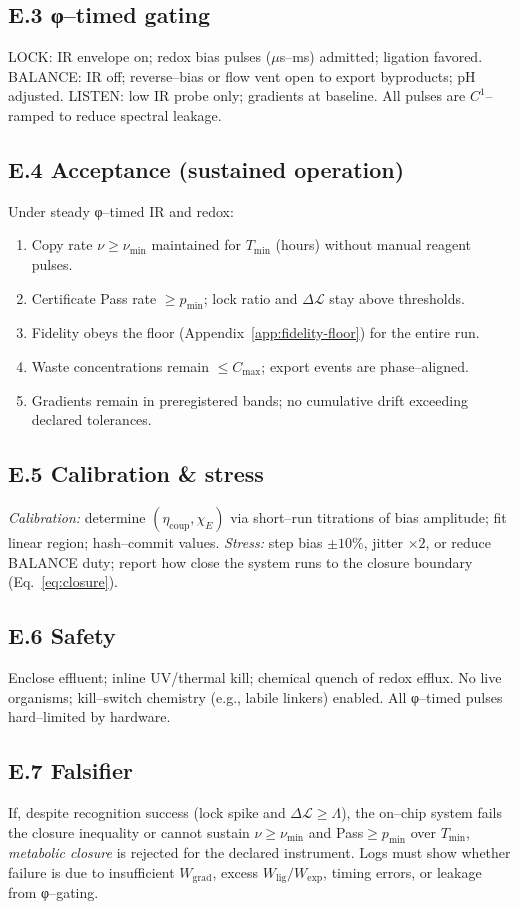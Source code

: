 \documentclass[11pt]{article}
\begin{document}
\subsection*{E.3 φ–timed gating}
\textsf{LOCK}: IR envelope on; redox bias pulses ($\mu$s–ms) admitted; ligation favored.  
\textsf{BALANCE}: IR off; reverse–bias or flow vent open to export byproducts; pH adjusted.  
\textsf{LISTEN}: low IR probe only; gradients at baseline. All pulses are $C^1$–ramped to reduce spectral leakage.

\subsection*{E.4 Acceptance (sustained operation)}
Under steady φ–timed IR and redox:
\begin{enumerate}
\item Copy rate $\nu\ge \nu_{\min}$ maintained for $T_{\min}$ (hours) without manual reagent pulses.
\item Certificate \textsf{Pass} rate $\ge p_{\min}$; lock ratio and $\Delta\mathcal{L}$ stay above thresholds.
\item Fidelity obeys the floor (Appendix~\ref{app:fidelity-floor}) for the entire run.
\item Waste concentrations remain $\le C_{\max}$; export events are phase–aligned.
\item Gradients remain in preregistered bands; no cumulative drift exceeding declared tolerances.
\end{enumerate}

\subsection*{E.5 Calibration \& stress}
\emph{Calibration:} determine $(\eta_{\mathrm{coup}},\chi_E)$ via short–run titrations of bias amplitude; fit linear region; hash–commit values.  
\emph{Stress:} step bias $\pm 10\%$, jitter $\times 2$, or reduce \textsf{BALANCE} duty; report how close the system runs to the closure boundary (Eq.~\eqref{eq:closure}).

\subsection*{E.6 Safety}
Enclose effluent; inline UV/thermal kill; chemical quench of redox efflux. No live organisms; kill–switch chemistry (e.g., labile linkers) enabled. All φ–timed pulses hard–limited by hardware.

\subsection*{E.7 Falsifier}
If, despite recognition success (lock spike and $\Delta\mathcal{L}\ge\Lambda$), the on–chip system fails the closure inequality or cannot sustain $\nu\ge \nu_{\min}$ and \textsf{Pass}$\ge p_{\min}$ over $T_{\min}$, \emph{metabolic closure} is rejected for the declared instrument. Logs must show whether failure is due to insufficient $W_{\mathrm{grad}}$, excess $W_{\mathrm{lig}}/W_{\mathrm{exp}}$, timing errors, or leakage from φ–gating.
\end{document}
